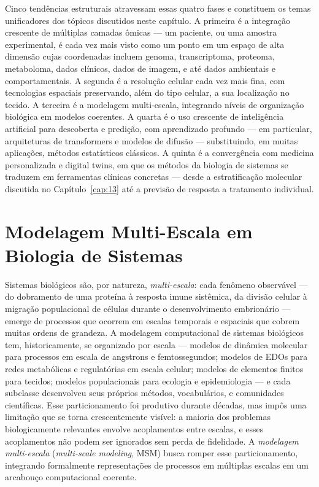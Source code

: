 Cinco tendências estruturais atravessam essas quatro fases e constituem os temas unificadores dos tópicos discutidos neste capítulo. A primeira é a integração crescente de múltiplas camadas ômicas --- um paciente, ou uma amostra experimental, é cada vez mais visto como um ponto em um espaço de alta dimensão cujas coordenadas incluem genoma, transcriptoma, proteoma, metaboloma, dados clínicos, dados de imagem, e até dados ambientais e comportamentais. A segunda é a resolução celular cada vez mais fina, com tecnologias espaciais preservando, além do tipo celular, a sua localização no tecido. A terceira é a modelagem multi-escala, integrando níveis de organização biológica em modelos coerentes. A quarta é o uso crescente de inteligência artificial para descoberta e predição, com aprendizado profundo --- em particular, arquiteturas de transformers e modelos de difusão --- substituindo, em muitas aplicações, métodos estatísticos clássicos. A quinta é a convergência com medicina personalizada e digital twins, em que os métodos da biologia de sistemas se traduzem em ferramentas clínicas concretas --- desde a estratificação molecular discutida no Capítulo~\ref{cap:13} até a previsão de resposta a tratamento individual.



\section{Modelagem Multi-Escala em Biologia de Sistemas}
\label{sec:15-multiescala}

Sistemas biológicos são, por natureza, \emph{multi-escala}: cada fenômeno observável --- do dobramento de uma proteína à resposta imune sistêmica, da divisão celular à migração populacional de células durante o desenvolvimento embrionário --- emerge de processos que ocorrem em escalas temporais e espaciais que cobrem muitas ordens de grandeza. A modelagem computacional de sistemas biológicos tem, historicamente, se organizado por escala --- modelos de dinâmica molecular para processos em escala de angstrons e femtossegundos; modelos de EDOs para redes metabólicas e regulatórias em escala celular; modelos de elementos finitos para tecidos; modelos populacionais para ecologia e epidemiologia --- e cada subclasse desenvolveu seus próprios métodos, vocabulários, e comunidades científicas. Esse particionamento foi produtivo durante décadas, mas impôs uma limitação que se torna crescentemente visível: a maioria dos problemas biologicamente relevantes envolve acoplamentos entre escalas, e esses acoplamentos não podem ser ignorados sem perda de fidelidade. A \emph{modelagem multi-escala} (\emph{multi-scale modeling}, MSM) busca romper esse particionamento, integrando formalmente representações de processos em múltiplas escalas em um arcabouço computacional coerente.

